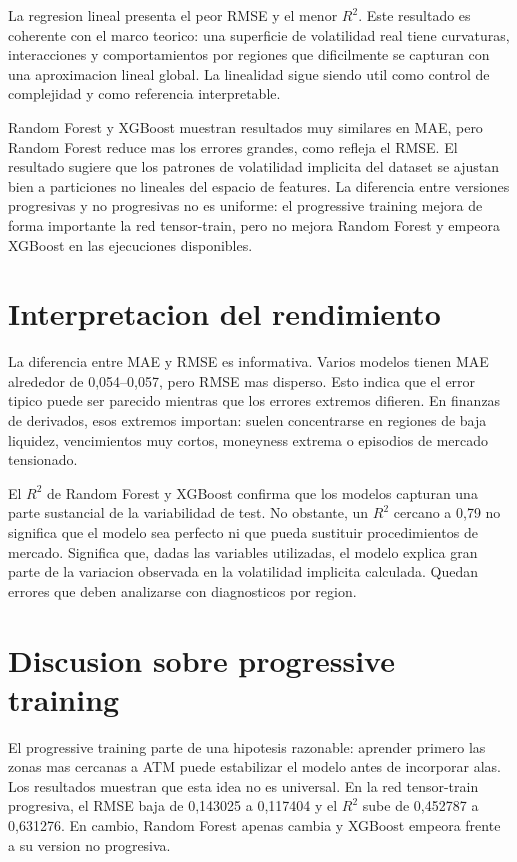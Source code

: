 La regresion lineal presenta el peor RMSE y el menor $R^2$. Este resultado es coherente con el marco teorico: una superficie de volatilidad real tiene curvaturas, interacciones y comportamientos por regiones que dificilmente se capturan con una aproximacion lineal global. La linealidad sigue siendo util como control de complejidad y como referencia interpretable.

Random Forest y XGBoost muestran resultados muy similares en MAE, pero Random Forest reduce mas los errores grandes, como refleja el RMSE. El resultado sugiere que los patrones de volatilidad implicita del dataset se ajustan bien a particiones no lineales del espacio de features. La diferencia entre versiones progresivas y no progresivas no es uniforme: el progressive training mejora de forma importante la red tensor-train, pero no mejora Random Forest y empeora XGBoost en las ejecuciones disponibles.

\section{Interpretacion del rendimiento}

La diferencia entre MAE y RMSE es informativa. Varios modelos tienen MAE alrededor de 0,054--0,057, pero RMSE mas disperso. Esto indica que el error tipico puede ser parecido mientras que los errores extremos difieren. En finanzas de derivados, esos extremos importan: suelen concentrarse en regiones de baja liquidez, vencimientos muy cortos, moneyness extrema o episodios de mercado tensionado.

El $R^2$ de Random Forest y XGBoost confirma que los modelos capturan una parte sustancial de la variabilidad de test. No obstante, un $R^2$ cercano a 0,79 no significa que el modelo sea perfecto ni que pueda sustituir procedimientos de mercado. Significa que, dadas las variables utilizadas, el modelo explica gran parte de la variacion observada en la volatilidad implicita calculada. Quedan errores que deben analizarse con diagnosticos por region.

\section{Discusion sobre progressive training}

El progressive training parte de una hipotesis razonable: aprender primero las zonas mas cercanas a ATM puede estabilizar el modelo antes de incorporar alas. Los resultados muestran que esta idea no es universal. En la red tensor-train progresiva, el RMSE baja de 0,143025 a 0,117404 y el $R^2$ sube de 0,452787 a 0,631276. En cambio, Random Forest apenas cambia y XGBoost empeora frente a su version no progresiva.

